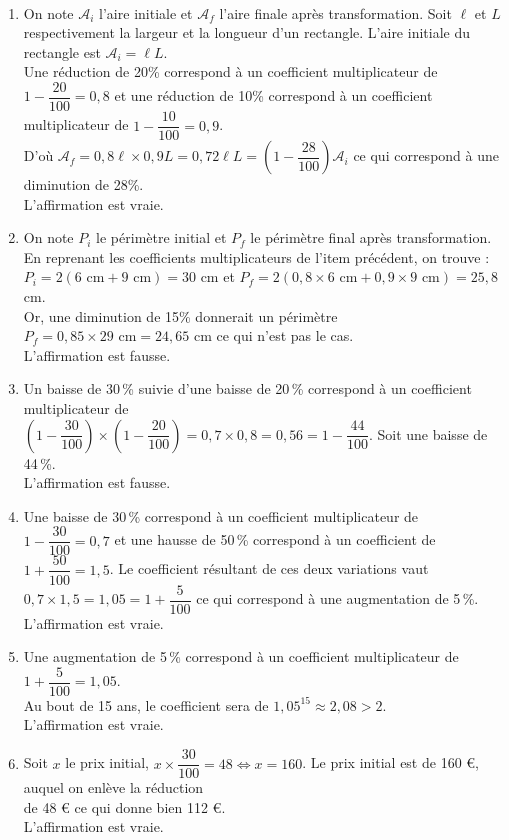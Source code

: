 \ \\ [-5mm]
   \begin{enumerate}
      \item On note $\mathcal{A}_i$ l'aire initiale et $\mathcal{A}_f$ l'aire finale après transformation. Soit $\ell$ et $L$ respectivement la largeur et la longueur d'un rectangle. L'aire initiale du rectangle est $\mathcal{A}_i =\ell L$. \\
         Une réduction de 20\% correspond à un coefficient multiplicateur de $1-\dfrac{20}{100} =0,8$ et une réduction de 10\% correspond à un coefficient multiplicateur de $1-\dfrac{10}{100} =0,9$. \\
          D'où $\mathcal{A}_f =0,8\ell\times0,9L =0,72\ell L =\left(1-\dfrac{28}{100}\right)\mathcal{A}_i$ ce qui correspond à une diminution de 28\%. \\
         {\blue L'affirmation est vraie.}
      \item On note $P_i$ le périmètre initial et $P_f$ le périmètre final après transformation. En reprenant les coefficients multiplicateurs de l'item précédent, on trouve : \\
         $P_i =2(6\text{ cm}+9\text{ cm}) =30$ cm et $P_f =2(0,8\times6\text{ cm}+0,9\times9\text{ cm}) =25,8$ cm. \\
         Or, une diminution de 15\% donnerait un périmètre $P_f =0,85\times29\text{ cm} =24,65$ cm ce qui n'est pas le cas. \\
          {\blue L'affirmation est fausse.}
       \item Un baisse de 30\,\% suivie d'une baisse de 20\,\% correspond à un coefficient multiplicateur de \\ [1mm]
          $\left(1-\dfrac{30}{100}\right)\times\left(1-\dfrac{20}{100}\right) =0,7\times0,8 =0,56 =1-\dfrac{44}{100}$. Soit une baisse de 44\,\%. \\ [1mm]
          {\blue L'affirmation est fausse.}
       \item Une baisse de 30\,\% correspond à un coefficient multiplicateur de $1-\dfrac{30}{100} =0,7$ et une hausse de 50\,\% correspond à un coefficient de $1+\dfrac{50}{100} =1,5$. Le coefficient résultant de ces deux variations vaut $0,7\times1,5 =1,05 =1+\dfrac{5}{100}$ ce qui correspond à une augmentation de 5\,\%. \\ [1mm]
         {\blue L'affirmation est vraie.}
      \item Une augmentation de 5\,\% correspond à un coefficient multiplicateur de $1+\dfrac{5}{100} =1,05$. \\
         Au bout de 15 ans, le coefficient sera de $1,05^{15} \approx2,08 >2$. \\ [1mm]
         {\blue L'affirmation est vraie.}
      \item Soit $x$ le prix initial, $x\times\dfrac{30}{100} =48 \iff x =160$. Le prix initial est de 160 \euro{}, auquel on enlève la réduction \\ [1mm]
   de 48 \euro{} ce qui donne bien 112 \euro. \\ [1mm]
       {\blue L'affirmation est vraie.} \\ [3mm]
   \end{enumerate}
